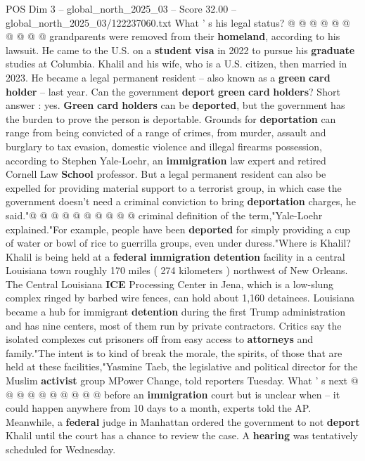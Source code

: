 \begin{textsample}{POS Dim 3 – global\_north\_2025\_03 – Score 32.00 – global\_north\_2025\_03/122237060.txt}
What ' s his legal status? @ @ @ @ @ @ @ @ @ @ grandparents were removed from their \textbf{homeland}, according to his lawsuit.
He came to the U.S. on a \textbf{student} \textbf{visa} in 2022 to pursue his \textbf{graduate} studies at Columbia.
Khalil and his wife, who is a U.S. citizen, then married in 2023.
He became a legal permanent resident -- also known as a \textbf{green} \textbf{card} \textbf{holder} -- last year.
Can the government \textbf{deport} \textbf{green} \textbf{card} \textbf{holders}?
Short answer : yes. \textbf{Green} \textbf{card} \textbf{holders} can be \textbf{deported}, but the government has the burden to prove the person is deportable.
Grounds for \textbf{deportation} can range from being convicted of a range of crimes, from murder, assault and burglary to tax evasion, domestic violence and illegal firearms possession, according to Stephen Yale-Loehr, an \textbf{immigration} law expert and retired Cornell Law \textbf{School} professor.
But a legal permanent resident can also be expelled for providing material support to a terrorist group, in which case the government doesn't need a criminal conviction to bring \textbf{deportation} charges, he said."@ @ @ @ @ @ @ @ @ @ criminal definition of the term,"Yale-Loehr explained."For example, people have been \textbf{deported} for simply providing a cup of water or bowl of rice to guerrilla groups, even under duress."Where is Khalil?
Khalil is being held at a \textbf{federal} \textbf{immigration} \textbf{detention} facility in a central Louisiana town roughly 170 miles ( 274 kilometers ) northwest of New Orleans.
The Central Louisiana \textbf{ICE} Processing Center in Jena, which is a low-slung complex ringed by barbed wire fences, can hold about 1,160 detainees.
Louisiana became a hub for immigrant \textbf{detention} during the first Trump administration and has nine centers, most of them run by private contractors.
Critics say the isolated complexes cut prisoners off from easy access to \textbf{attorneys} and family."The intent is to kind of break the morale, the spirits, of those that are held at these facilities,"Yasmine Taeb, the legislative and political director for the Muslim \textbf{activist} group MPower Change, told reporters Tuesday.
What ' s next @ @ @ @ @ @ @ @ @ @ before an \textbf{immigration} court but is unclear when -- it could happen anywhere from 10 days to a month, experts told the AP.
Meanwhile, a \textbf{federal} judge in Manhattan ordered the government to not \textbf{deport} Khalil until the court has a chance to review the case.
A \textbf{hearing} was tentatively scheduled for Wednesday.

\end{textsample}
